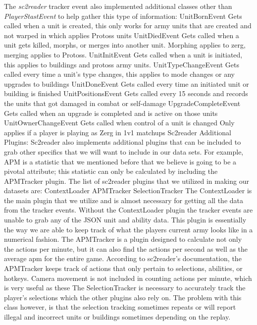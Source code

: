 \documentclass[a4paper,12pt]{report}
\begin{document}
The \textit{sc2reader} tracker event also implemented additional classes other than \textit{PlayerStastEvent} to help gather this type of information:
UnitBornEvent
Gets called when a unit is created, this only works for army units that are created and not warped in which applies Protoss units
UnitDiedEvent
Gets called when a unit gets killed, morphs, or merges into another unit. Morphing applies to zerg, merging applies to Protoss. 
UnitInitEvent
Gets called when a unit is initiated, this applies to buildings and protoss army units.
UnitTypeChangeEvent
Gets called every time a unit’s type changes, this applies to mode changes or any upgrades to buildings
UnitDoneEvent
Gets called every time an initiated unit or building is finished
UnitPositionsEvent
Gets called every 15 seconds and records the units that got damaged in combat or self-damage
UpgradeCompleteEvent
Gets called when an upgrade is completed and is active on those units
UnitOwnerChangeEvent
Gets called when control of a unit is changed
Only applies if a player is playing as Zerg in 1v1 matchups 
Sc2reader Additional Plugins:
Sc2reader also implements additional plugins that can be included to grab other specifics that we will want to include in our data sets. For example, APM is a statistic that we mentioned before that we believe is going to be a pivotal attribute; this statistic can only be calculated by including the APMTracker plugin. The list of  sc2reader plugins that we utilized in making our datasets are:
ContextLoader
APMTracker
SelectionTracker
The ContextLoader is the main plugin that we utilize and is almost necessary for getting all the data from the tracker events. Without the ContextLoader plugin the tracker events are unable to grab any of the JSON unit and ability data. This plugin is essentially the way we are able to keep track of what the players current army looks like in a numerical fashion.
The APMTracker is a plugin designed to calculate not only the actions per minute, but it can also find the actions per second as well as the average apm for the entire game. According to sc2reader’s documentation, the APMTracker keeps track of actions that only pertain to selections, abilities, or hotkeys. Camera movement is not included in counting actions per minute, which is very useful as these 
The SelectionTracker is necessary to accurately track the player’s selections which the other plugins also rely on. The problem with this class however, is that the selection tracking sometimes repeats or will report illegal and incorrect units or buildings sometimes depending on the replay.
\end{document}
